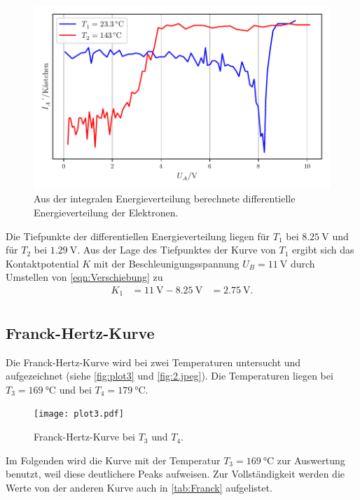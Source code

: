 \begin{figure}[H]
  \centering
  \includegraphics[width=\textwidth]{build/plot2.pdf}
  \caption {Aus der integralen Energieverteilung berechnete differentielle Energieverteilung der Elektronen.}
  \label{fig:plot2}
\end{figure}
Die Tiefpunkte der differentiellen Energieverteilung liegen für $T_1$ bei $\qty{8.25}{\volt}$ und für $T_2$ bei $\qty{1.29}{\volt}$.
Aus der Lage des Tiefpunktes der Kurve von $T_1$ ergibt sich das Kontaktpotential $K$ mit der Beschleunigungsspannung $U_B= \qty{11}{\volt}$
durch Umstellen von \autoref{eqn:Verschiebung} zu
\begin{align*}
  K_1 &= \qty{11}{\volt}-\qty{8.25}{\volt} &= \qty{2.75}{\volt}.\\
\end{align*}

\subsection{Franck-Hertz-Kurve} %
\label{sub:Franck-Hertz-Kurve}
Die Franck-Hertz-Kurve wird bei zwei Temperaturen untersucht und aufgezeichnet (siehe \autoref{fig:plot3} und \autoref{fig:2.jpeg}). 
Die Temperaturen liegen bei $T_3= \qty{169}{\celsius}$ und bei $T_4= \qty{179}{\celsius}$.

\begin{figure}[H]
  \centering
  \texttt{[image: plot3.pdf]}
  \caption{Franck-Hertz-Kurve bei $T_3$ und $T_4$.}
  \label{fig:plot3}
\end{figure}

Im Folgenden wird die Kurve mit der Temperatur $T_3 = \qty{169}{\celsius}$ zur Auswertung benutzt, weil diese deutlichere Peaks aufweisen. Zur Vollständigkeit
werden die Werte von der anderen Kurve auch in \autoref{tab:Franck} aufgelistet.

